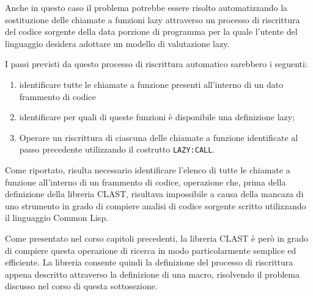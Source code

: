 Anche in questo caso il problema potrebbe essere risolto automatizzando la
sostituzione delle chiamate a funzioni lazy attraverso un processo di
riscrittura del codice sorgente della data porzione di programma per la quale
l'utente del linguaggio desidera adottare un modello di valutazione lazy.

I passi previsti da questo processo di riscrittura automatico sarebbero i
seguenti:

\begin{enumerate}

\item identificare tutte le chiamate a funzione presenti all'interno di un dato
frammento di codice

\item identificare per quali di queste funzioni è disponibile una definizione
lazy;

\item Operare un riscrittura di ciascuna delle chiamate a funzione identificate
al passo precedente utilizzando il costrutto \texttt{LAZY:CALL}.

\end{enumerate}

Come riportato, risulta necessario identificare l'elenco di tutte le chiamate a
funzione all'interno di un frammento di codice, operazione che, prima della
definizione della libreria CLAST, risultava impossibile a causa della mancaza di
uno strumento in grado di compiere analisi di codice sorgente scritto
utilizzando il linguaggio Common Lisp.

Come presentato nel corso capitoli precedenti, la libreria CLAST è però in grado
di compiere questa operazione di ricerca in modo particolarmente semplice ed
efficiente. La libreria consente quindi la definizione del processo di
riscrittura appena descritto attraverso la definizione di una macro, risolvendo
il problema discusso nel corso di questa sottosezione.\\

